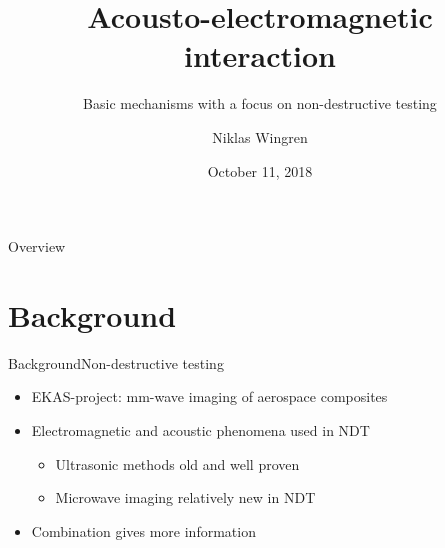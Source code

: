 \documentclass[11pt]{beamer}
\begin{document}
	\author{Niklas Wingren}
	\title{Acousto-electromagnetic interaction}
	\subtitle{Basic mechanisms with a focus on non-destructive testing}
	\date{October 11, 2018}
	\frame[plain]{\maketitle}
	
	\begin{frame}{Overview}
		\tableofcontents
	\end{frame}
	
	
	\section{Background}
	\begin{frame}{Background}{Non-destructive testing}
		\pause
		\begin{itemize}
			\item EKAS-project: mm-wave imaging of aerospace composites
			\pause
			\item Electromagnetic and acoustic phenomena used in NDT
			\begin{itemize}
				\pause
				\item Ultrasonic methods old and well proven
				\pause
				\item Microwave imaging relatively new in NDT
			\end{itemize}
			\pause
			\item Combination gives more information
		\end{itemize}
	\end{frame}
	
\end{document}
